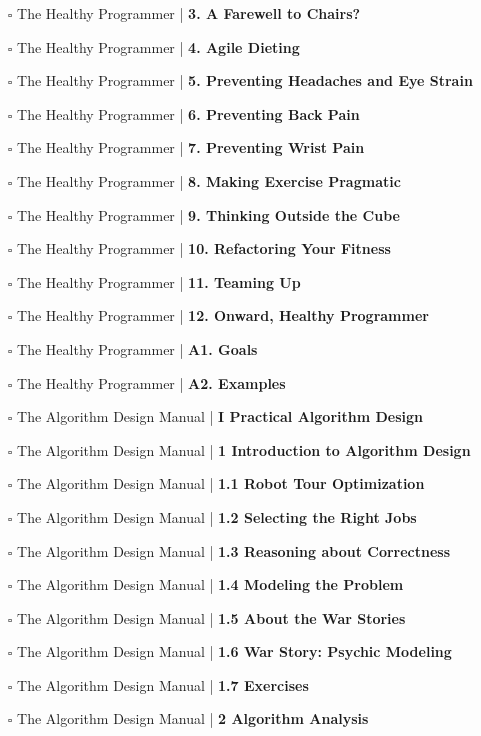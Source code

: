 \documentclass[a4, landscape, 12pt]{article}
\newcommand{\checkbox}{$\square$}%
\begin{document}
\begin{itemize}
{}
\item [\checkbox]  The Healthy Programmer | \textbf{ 3. A Farewell to Chairs?
}
\item [\checkbox]  The Healthy Programmer | \textbf{ 4. Agile Dieting
}
\item [\checkbox]  The Healthy Programmer | \textbf{ 5. Preventing Headaches and Eye Strain
}
\item [\checkbox]  The Healthy Programmer | \textbf{ 6. Preventing Back Pain
}
\item [\checkbox]  The Healthy Programmer | \textbf{ 7. Preventing Wrist Pain
}
\item [\checkbox]  The Healthy Programmer | \textbf{ 8. Making Exercise Pragmatic
}
\item [\checkbox]  The Healthy Programmer | \textbf{ 9. Thinking Outside the Cube
}
\item [\checkbox]  The Healthy Programmer | \textbf{ 10. Refactoring Your Fitness
}
\item [\checkbox]  The Healthy Programmer | \textbf{ 11. Teaming Up
}
\item [\checkbox]  The Healthy Programmer | \textbf{ 12. Onward, Healthy Programmer
}
\item [\checkbox]  The Healthy Programmer | \textbf{ A1. Goals
}
\item [\checkbox]  The Healthy Programmer | \textbf{ A2. Examples
}
\item [\checkbox]  The Algorithm Design Manual | \textbf{ I Practical Algorithm Design
}
\item [\checkbox]  The Algorithm Design Manual | \textbf{ 1 Introduction to Algorithm Design
}
\item [\checkbox]  The Algorithm Design Manual | \textbf{ 1.1 Robot Tour Optimization
}
\item [\checkbox]  The Algorithm Design Manual | \textbf{ 1.2 Selecting the Right Jobs
}
\item [\checkbox]  The Algorithm Design Manual | \textbf{ 1.3 Reasoning about Correctness
}
\item [\checkbox]  The Algorithm Design Manual | \textbf{ 1.4 Modeling the Problem
}
\item [\checkbox]  The Algorithm Design Manual | \textbf{ 1.5 About the War Stories
}
\item [\checkbox]  The Algorithm Design Manual | \textbf{ 1.6 War Story: Psychic Modeling
}
\item [\checkbox]  The Algorithm Design Manual | \textbf{ 1.7 Exercises
}
\item [\checkbox]  The Algorithm Design Manual | \textbf{ 2 Algorithm Analysis
}
\end{itemize}
\end{document}
